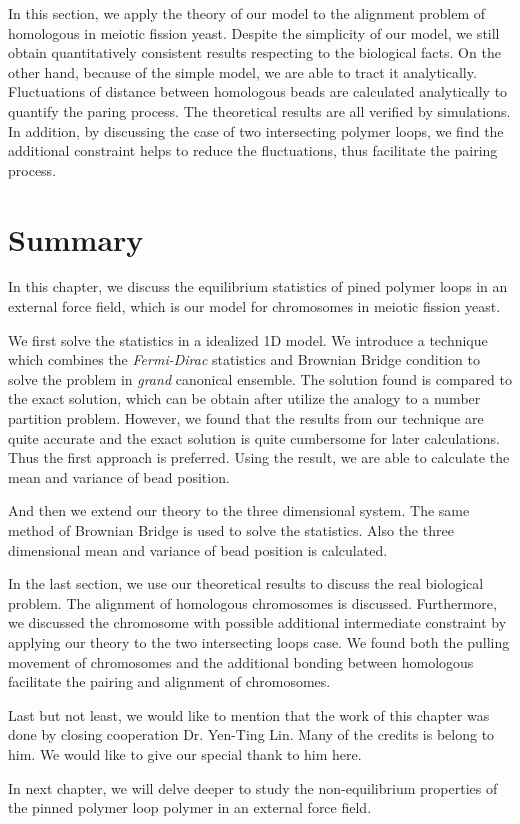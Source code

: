 In this section, we apply the theory of our model to the alignment problem of homologous in meiotic fission yeast. Despite the simplicity of our model, we still obtain quantitatively consistent results respecting to the biological facts. On the other hand, because of the simple model, we are able to tract it analytically. Fluctuations of distance between homologous beads are calculated analytically to quantify the paring process. The theoretical results are all verified by simulations. In addition, by discussing the case of two intersecting polymer loops, we find the additional constraint helps to reduce the fluctuations, thus facilitate the pairing process. 



\section{Summary}
\label{sec:summary_chp3}

In this chapter, we discuss the equilibrium statistics of pined polymer loops in an external force field, which is our model for chromosomes in meiotic fission yeast. 

We first solve the statistics in a idealized 1D model. We introduce a technique which combines the \emph{Fermi-Dirac} statistics and Brownian Bridge condition to solve the problem in \emph{grand} canonical ensemble. The solution found is compared to the exact solution, which can be obtain after utilize the analogy to a number partition problem. However, we found that the results from our technique are quite accurate and the exact solution is quite cumbersome for later calculations. Thus the first approach is preferred. Using the result, we are able to calculate the mean and variance of bead position.  

And then we extend our theory to the three dimensional system. The same method of Brownian Bridge is used to solve the statistics. Also the three dimensional mean and variance of bead position is calculated. 

In the last section, we use our theoretical results to discuss the real biological problem. The alignment of homologous chromosomes is discussed. Furthermore, we discussed the chromosome with possible additional intermediate constraint by applying our theory to the two intersecting loops case. We found both the pulling movement of chromosomes and the additional bonding between homologous facilitate the pairing and alignment of chromosomes.

Last but not least, we would like to mention that the work of this chapter was done by closing cooperation Dr. Yen-Ting Lin. Many of the credits is belong to him. We would like to give our special thank to him here. 

In next chapter, we will delve deeper to study the non-equilibrium properties of the pinned polymer loop polymer in an external force field. 
